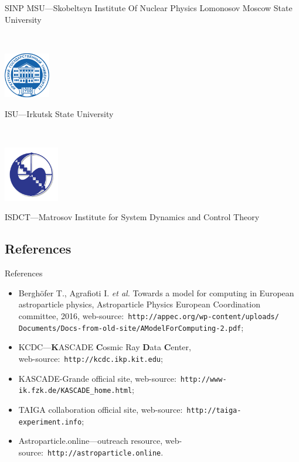 \documentclass[18pt]{beamer}
\begin{document}
\begin{frame}[allowframebreaks]
{}\hfill
\parbox{0.75\textwidth}{
  SINP MSU---Skobeltsyn Institute Of Nuclear Physics Lomonosov Moscow State University
}
\\\vspace{1em}
\parbox{0.20\textwidth}{
  \centering\includegraphics[width=0.15\textwidth]{pics/isu_logo.png}
}\hfill
\parbox{0.75\textwidth}{
  ISU---Irkutsk State University
}
\\\vspace{1em}
\parbox{0.20\textwidth}{
  \centering\includegraphics[width=0.18\textwidth]{pics/matr_logo.png}
}\hfill
\parbox{0.75\textwidth}{
  ISDCT---Matrosov Institute for System Dynamics and Control Theory
}
\end{frame}

\subsection{References}
\begin{frame}{References}
  \begin{itemize}
   \item Berghöfer T., Agrafioti I. \textit{et al.} Towards a model for computing in European astroparticle physics,
   Astroparticle Physics European Coordination committee, 2016,
   web-source:~\texttt{http://appec.org/wp-content/uploads/\\Documents/Docs-from-old-site/AModelForComputing-2.pdf};
   \item KCDC---\textbf{K}ASCADE \textbf{C}osmic Ray \textbf{D}ata \textbf{C}enter,\\
   web-source:~\texttt{http://kcdc.ikp.kit.edu};
   \item KASCADE-Grande official site, web-source:~\texttt{http://www-ik.fzk.de/KASCADE\_home.html};
   \item TAIGA collaboration official site, web-source:~\texttt{http://taiga-experiment.info};
   \item Astroparticle.online---outreach resource, web-source:~\texttt{http://astroparticle.online}.

  \end{itemize}

\end{frame}



\backupend
\end{document}
